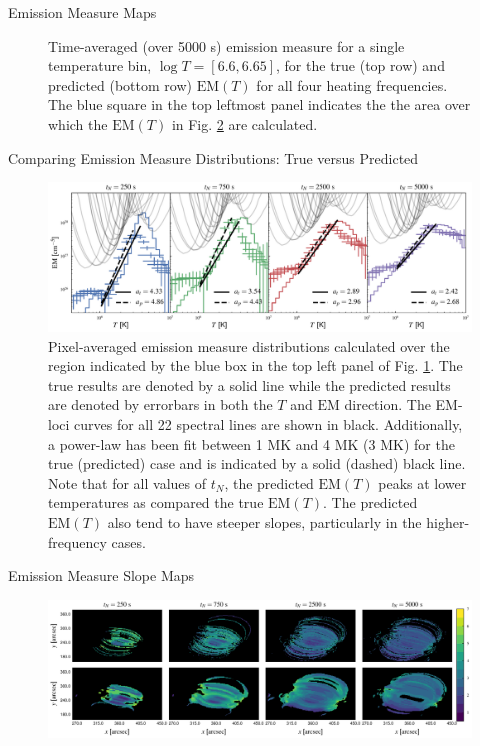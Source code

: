 \documentclass[final]{beamer}
\begin{document}
\begin{frame}
\begin{columns}[T]
\begin{column}{0.49\linewidth}
\begin{block}{Emission Measure Maps}
\begin{figure}
        \caption{Time-averaged (over 5000 s) emission measure for a single temperature bin, $\log{T}=[6.6,6.65]$, for the true (top row) and predicted (bottom row) $\mathrm{EM}(T)$ for all four heating frequencies. The blue square in the top leftmost panel indicates the the area over which the $\mathrm{EM}(T)$ in Fig. \ref{fig:em_1d} are calculated.} 
        \label{fig:total_em_map}
      \end{figure}
      \vspace{-1ex}
    \end{block}
    \begin{block}{Comparing Emission Measure Distributions: True versus Predicted}
      \begin{figure}
        \includegraphics[width=\columnwidth]{figures/em_1d_compare.pdf}
        \caption{Pixel-averaged emission measure distributions calculated over the region indicated by the blue box in the top left panel of Fig. \ref{fig:total_em_map}. The true results are denoted by a solid line while the predicted results are denoted by errorbars in both the $T$ and $\mathrm{EM}$ direction. The EM-loci curves for all 22 spectral lines are shown in black. Additionally, a power-law has been fit between 1 MK and 4 MK (3 MK) for the true (predicted) case and is indicated by a solid (dashed) black line. Note that for all values of $t_N$, the predicted $\mathrm{EM}(T)$ peaks at lower temperatures as compared the true $\mathrm{EM}(T)$. The predicted $\mathrm{EM}(T)$ also tend to have steeper slopes, particularly in the higher-frequency cases.}
        \label{fig:em_1d}
      \end{figure}
      \vspace{-0.5ex}
    \end{block}
    \begin{block}{Emission Measure Slope Maps}
      \begin{figure}
        \includegraphics[width=\columnwidth]{figures/em_slope_maps.pdf}

\end{figure}
\end{block}
\end{column}
\end{columns}
\end{frame}
\end{document}

